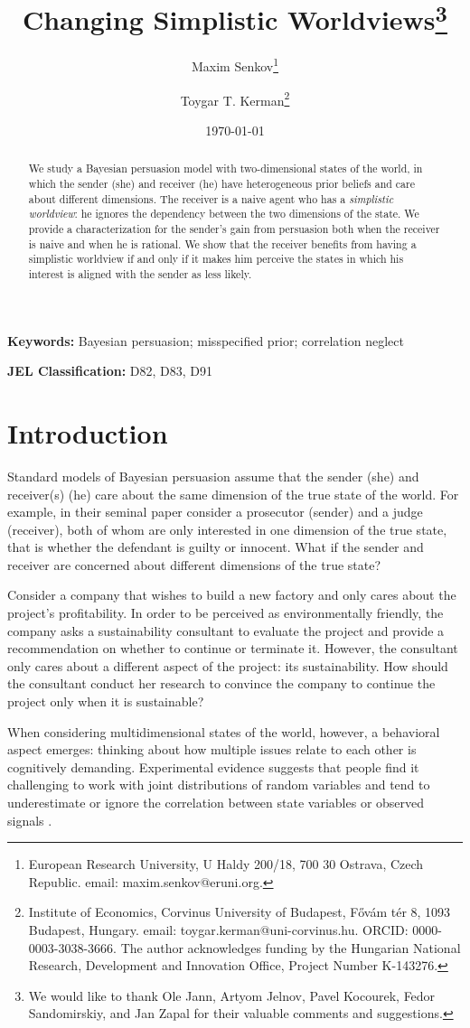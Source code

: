 \documentclass[12pt,english]{article}
\title{\date{\today}}
\title{Changing Simplistic Worldviews\thanks{We would like to thank Ole Jann, Artyom Jelnov, Pavel Kocourek, Fedor Sandomirskiy, and Jan Zapal for their valuable comments and suggestions.}}
\author{
        Maxim Senkov\thanks{European Research University, U Haldy 200/18, 700 30 Ostrava, Czech Republic. email: maxim.senkov@eruni.org.} \\
        \and
	Toygar T. Kerman\thanks{Institute of Economics, Corvinus University of Budapest, F\H{o}v\'{a}m t\'{e}r 8, 1093 Budapest, Hungary. email: toygar.kerman@uni-corvinus.hu. ORCID: 0000-0003-3038-3666. The author acknowledges funding by the Hungarian National Research, Development and Innovation Office, Project Number K-143276.}  
}
\providecommand{\keywords}[1]{\textbf{Keywords:} #1}
\providecommand{\JEL}[1]{\textbf{JEL Classification:} #1}
\theoremstyle{plain}
\begin{document}
\maketitle

\begin{abstract}
\noindent We study a Bayesian persuasion model with two-dimensional states of the world, in which the sender (she) and receiver (he) have heterogeneous prior beliefs and care about different dimensions. 
The receiver is a naive agent who has a \emph{simplistic worldview}: he ignores the dependency between the two dimensions of the state. 
We provide a characterization for the sender's gain from persuasion both when the receiver is naive and when he is rational.
We show that the receiver benefits from having a simplistic worldview if and only if it makes him perceive the states in which his interest is aligned with the sender as less likely.
\end{abstract}

\noindent\keywords{Bayesian persuasion; misspecified prior; correlation neglect}


\noindent\JEL{D82, D83, D91}

\section{Introduction}
Standard models of Bayesian persuasion assume that the sender (she) and receiver(s) (he) care about the same dimension of the true state of the world. 
For example, in their seminal paper \cite{kamenica2011bayesian} consider a prosecutor (sender) and a judge (receiver), both of whom are only interested in one dimension of the true state, that is whether the defendant is guilty or innocent. 
What if the sender and receiver are concerned about different dimensions of the true state? 

Consider a company that wishes to build a new factory and only cares about the project's profitability. 
In order to be perceived as environmentally friendly, the company asks a sustainability consultant to evaluate the project and provide a recommendation on whether to continue or terminate it.
However, the consultant only cares about a different aspect of the project: its sustainability.  
How should the consultant conduct her research to convince the company to continue the project only when it is sustainable? 

When considering multidimensional states of the world, however, a behavioral aspect emerges: thinking about how multiple issues relate to each other is cognitively demanding. 
Experimental evidence suggests that people find it challenging to work with joint distributions of random variables and tend to underestimate or ignore the correlation between state variables or observed signals \citep{kallir2009neglect,eyster2011correlation,enke2019correlation}.
\end{document}
